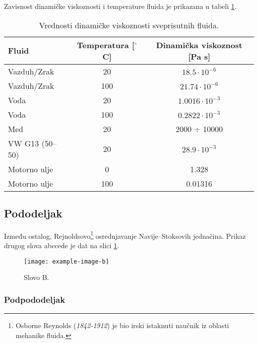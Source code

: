 \documentclass[12pt,serbian]{article} %
\numberwithin{figure}{section}
\numberwithin{table}{section}
\begin{document}
Zavisnost dinamičke viskoznosti i temperature fluida je prikazana u tabeli \ref{tab:din_vis}.
\begin{table}[H]
\small
\centering
\begin{tabular}{@{}lcc@{}}
\textbf{Fluid} & \textbf{Temperatura} [$^{\circ}$C] & \textbf{Dinamička viskoznost} [Pa s] \\
\bottomrule
Vazduh/Zrak  & 20  & $18.5 \cdot 10^{-6}$   \\

Vazduh/Zrak  & 100  & $21.74 \cdot 10^{-6}$   \\

Voda & 20 & $1.0016 \cdot 10^{-3}$\\

Voda & 100 &  $0.2822 \cdot 10^{-3}$\\

Med & 20 & 2000 $\div$ 10000\\

VW G13 (50--50) & 20  & $28.9 \cdot 10^{-3}$\\

Motorno ulje & 0 & 1.328\\

Motorno ulje & 100 & 0.01316\\
\bottomrule
\end{tabular}
\caption{Vrednosti dinamičke viskoznosti sveprisutnih fluida.}
\label{tab:din_vis}
\end{table}


\subsection{Pododeljak}
Između ostalog, Rejnoldsovo\footnote{Osborne Reynolds  (\textit{{1842-1912}}) je bio irski istaknuti naučnik iz oblasti mehanike fluida.} osrednjavanje Navije--Stoksovih jednačina. Prikaz drugog slova abecede je dat na slici \ref{fig:slovo_B}.


\begin{figure}[H]
    \centering
    \texttt{[image: example-image-b]}
    \caption{Slovo B.}
    \label{fig:slovo_B}
\end{figure}



\subsubsection{Podpododeljak}
\end{document}
